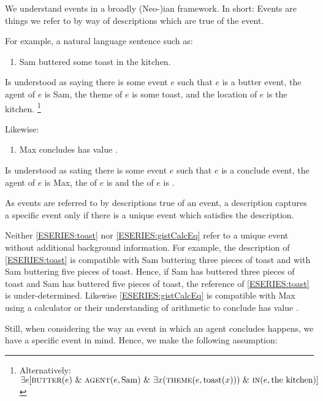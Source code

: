 \begin{note}
  We understand events in a broadly (Neo-)\citeauthor{Davidson:1967aa}ian framework.
  In short:
  Events are things we refer to by way of descriptions which are true of the event.

  For example, a natural language sentence such as:
  \begin{enumerate}[label=\arabic*., ref=(\arabic*), series=ESERIES]
  \item
    \label{ESERIES:toast}
    Sam buttered some toast in the kitchen.
  \end{enumerate}
  Is understood as saying there is some event \(e\) such that \(e\) is a butter event, the agent of \(e\) is Sam, the theme of \(e\) is some toast, and the location of \(e\) is the kitchen.%
  \footnote{
    Alternatively:
    \(\exists e [\textsc{butter}(e)\text{ \& }\textsc{agent}(e, \text{Sam})\text{ \& }\exists x(\textsc{theme}(e, \text{toast}(x)))\text{ \& }\textsc{in}(e, \text{the kitchen})]\)
  }

  Likewise:
  \begin{enumerate}[label=\arabic*., ref=(\arabic*), resume*=ESERIES]
  \item
    \label{ESERIES:gistCalcEq}
    Max concludes \gistCalcEq{} has value .
  \end{enumerate}
  Is understood as sating there is some event \(e\) such that \(e\) is a conclude event, the agent of \(e\) is Max, the  of \(e\) is \gistCalcEq{} and the \val{} of \(e\) is .

  As events are referred to by descriptions true of an event, a description captures a specific event only if there is a unique event which satisfies the description.

  Neither \ref{ESERIES:toast} nor \ref{ESERIES:gistCalcEq} refer to a unique event without additional background information.
  For example, the description of \ref{ESERIES:toast} is compatible with Sam buttering three pieces of toast and with Sam buttering five pieces of toast.
  Hence, if Sam has buttered three pieces of toast and Sam has buttered five pieces of toast, the reference of \ref{ESERIES:toast} is under-determined.
  Likewise \ref{ESERIES:gistCalcEq} is compatible with Max using a calculator or their understanding of arithmetic to conclude \gistCalcEq{} has value .

  Still, when considering the way an event in which an agent concludes happens, we have a specific event in mind.
  Hence, we make the following assumption:


\end{note}

